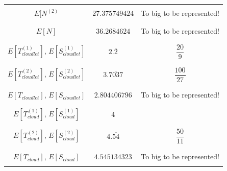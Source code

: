 \documentclass[10pt,a4paper]{article}
\begin{document}
\begin{table}[h!]
\begin{adjustbox}{center=\textwidth}
\begin{tabular}{c|c|c}
     &&\\\hline &&\\

	 $E[N^{(2)}$ & $27.375749424$ & To big to be represented! \\
	 
	 &&\\\hline &&\\
	 
	 $E[N]$ & $36.2684624$ & To big to be represented! \\

	 &&\\\hline &&\\

	 $E[T^{(1)}_{cloudlet}]$, $E[S^{(1)}_{cloudlet}]$ & $2.\overline{2}$ & $\dfrac{20}{9}$  \\
     
     &&\\\hline &&\\
     
     $E[T^{(2)}_{cloudlet}]$, $E[S^{(2)}_{cloudlet}]$ & $3.\overline{7037}$ & $\dfrac{100}{27}$  \\
     
     &&\\\hline &&\\
	 
	 $E[T_{cloudlet}]$, $E[S_{cloudlet}]$ & $2.804406796$ & To big to be represented! \\     
              
     &&\\\hline &&\\
     
     $E[T^{(1)}_{cloud}]$, $E[S^{(1)}_{cloud}]$ & $4$ & \\
     
     &&\\\hline &&\\
     
     $E[T^{(2)}_{cloud}]$, $E[S^{(2)}_{cloud}]$ & $4.\overline{54}$ & $\dfrac{50}{11}$  \\
     
     &&\\\hline &&\\
     
     $E[T_{cloud}]$, $E[S_{cloud}]$ & $4.545134323$ & To big to be represented!  \\


	 
	 &&\\

     \bottomrule

    \end{tabular}
    \end{adjustbox}
\end{table}
\end{document}
